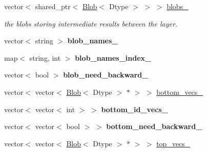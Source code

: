 \begin{DoxyCompactItemize}
\item 
vector$<$ shared\+\_\+ptr$<$ \hyperlink{classcaffe_1_1Blob}{Blob}$<$ Dtype $>$ $>$ $>$ \hyperlink{classcaffe_1_1Net_ab033c0574fcbf1e67e22b9682677c64d}{blobs\+\_\+}\hypertarget{classcaffe_1_1Net_ab033c0574fcbf1e67e22b9682677c64d}{}\label{classcaffe_1_1Net_ab033c0574fcbf1e67e22b9682677c64d}

\begin{DoxyCompactList}\small\item\em the blobs storing intermediate results between the layer. \end{DoxyCompactList}\item 
vector$<$ string $>$ {\bfseries blob\+\_\+names\+\_\+}\hypertarget{classcaffe_1_1Net_a0055d38b35ea1a2f44bd400dd6d10846}{}\label{classcaffe_1_1Net_a0055d38b35ea1a2f44bd400dd6d10846}

\item 
map$<$ string, int $>$ {\bfseries blob\+\_\+names\+\_\+index\+\_\+}\hypertarget{classcaffe_1_1Net_a45f232e36045689438a7e1d869ed399c}{}\label{classcaffe_1_1Net_a45f232e36045689438a7e1d869ed399c}

\item 
vector$<$ bool $>$ {\bfseries blob\+\_\+need\+\_\+backward\+\_\+}\hypertarget{classcaffe_1_1Net_a16cedebd7cc82e0b3a30617b71d4c3f7}{}\label{classcaffe_1_1Net_a16cedebd7cc82e0b3a30617b71d4c3f7}

\item 
vector$<$ vector$<$ \hyperlink{classcaffe_1_1Blob}{Blob}$<$ Dtype $>$ $\ast$ $>$ $>$ \hyperlink{classcaffe_1_1Net_ac5bf2007047f749d9d111b0dfa220afc}{bottom\+\_\+vecs\+\_\+}
\item 
vector$<$ vector$<$ int $>$ $>$ {\bfseries bottom\+\_\+id\+\_\+vecs\+\_\+}\hypertarget{classcaffe_1_1Net_a49ce49e288297963f0d9f7a6d790daa6}{}\label{classcaffe_1_1Net_a49ce49e288297963f0d9f7a6d790daa6}

\item 
vector$<$ vector$<$ bool $>$ $>$ {\bfseries bottom\+\_\+need\+\_\+backward\+\_\+}\hypertarget{classcaffe_1_1Net_ae7276d8a8b51a10bb269c46f6afb44b0}{}\label{classcaffe_1_1Net_ae7276d8a8b51a10bb269c46f6afb44b0}

\item 
vector$<$ vector$<$ \hyperlink{classcaffe_1_1Blob}{Blob}$<$ Dtype $>$ $\ast$ $>$ $>$ \hyperlink{classcaffe_1_1Net_aa834096a02382d9a881bf33694e72564}{top\+\_\+vecs\+\_\+}\hypertarget{classcaffe_1_1Net_aa834096a02382d9a881bf33694e72564}{}\label{classcaffe_1_1Net_aa834096a02382d9a881bf33694e72564}


\end{DoxyCompactItemize}

